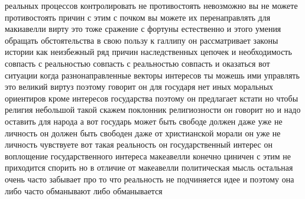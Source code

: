 реальных процессов контролировать не противостоять невозможно вы не можете
противостоять причин с этим с почком вы можете их перенаправлять для макиавелли
вирту это тоже сражение с фортуны естественно и этого умения обращать
обстоятельства в свою пользу к галлипу он рассматривает законы истории как
неизбежный ряд причин наследственных цепочек и необходимость совпасть с
реальностью совпасть с реальностью совпасть и оказаться вот ситуации когда
разнонаправленные векторы интересов ты можешь ими управлять это великий виртуз
поэтому говорит он для государя нет иных моральных ориентиров кроме интересов
государства поэтому он предлагает кстати но чтобы религия небольшой такой скажем
поклонник религиозности он говорит но и надо оставить для народа а вот государь
может быть свободе должен даже уже не личность он должен быть свободен даже от
христианской морали он уже не личность чувствуете вот такая реальность он
государственный интерес он воплощение государственного интереса макеавелли
конечно циничен с этим не приходится спорить но в отличие от макеавелли
политическая мысль остальная очень часто забывает про то что реальность не
подчиняется идее и поэтому она либо часто обманывают либо обманывается 

